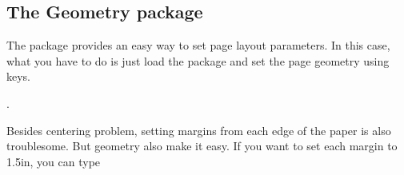 \subsection{The Geometry package}

The package  \cite{geometry} provides
an easy way to set page layout parameters. In this case, what you have to do is just load the package and set
the page geometry using keys.

\begin{teX}
\usepackage[text={7in,10in},centering]{geometry}.
\end{teX}

Besides centering problem, setting margins from each edge of the paper is also troublesome. But geometry
also make it easy. If you want to set each margin to 1.5in, you can type


